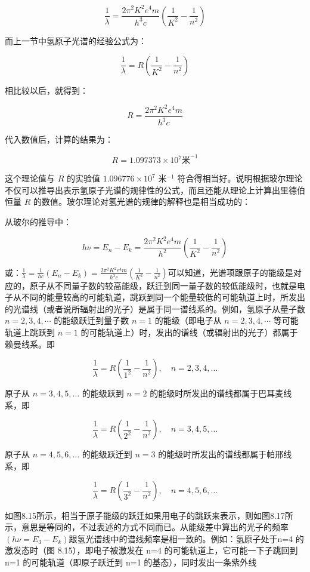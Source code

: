 \[
\frac {1}{\lambda} = \frac {2 \pi^ {2} K ^ {2} e ^ {4} m}{h ^ {3} c} \left(\frac {1}{K ^ {2}} - \frac {1}{n ^ {2}}\right)
\]

而上一节中氢原子光谱的经验公式为：

\[
\frac {1}{\lambda} = R \left(\frac {1}{K ^ {2}} - \frac {1}{n ^ {2}}\right)
\]

相比较以后，就得到：

\[
R = \frac {2 \pi^ {2} K ^ {2} e ^ {4} m}{h ^ {3} c}
\]

代入数值后，计算的结果为：

\[
R = 1.097373 \times 10 ^ {7} \text{米} ^ {- 1}
\]

这个理论值与 \(R\) 的实验值 \(1.096776 \times 10^{7}\) 米\(^{-1}\)
符合得相当好。说明根据玻尔理论不仅可以推导出表示氢原子光谱的规律性的公式，而且还能从理论上计算出里德伯恒量
\(R\) 的数值。玻尔理论对氢光谱的规律的解释也是相当成功的：

从玻尔的推导中：

\[
h \nu = E _ {n} - E _ {k} = \frac {2 \pi^ {2} K ^ {2} e ^ {4} m}{h ^ {2}} \left(\frac {1}{K ^ {2}} - \frac {1}{n ^ {2}}\right)
\]

或：\(\frac{1}{\lambda} = \frac{1}{hc}\left(E_n - E_k\right) = \frac{2\pi^2K^2e^4m}{h^3c}\left(\frac{1}{K^2} -\frac{1}{n^2}\right)\)可以知道，光谱项跟原子的能级是对应的，原子从不同量子数的较高能级，跃迁到同一量子数的较低能级时，也就是电子从不同的能量较高的可能轨道，跳跃到同一个能量较低的可能轨道上时，所发出的光谱线（或者说所辐射出的光子）是属于同一谱线系的。例如，氢原子从量子数
\(n=2,3,4,\cdots\) 的能级跃迁到量子数 \(n=1\) 的能级（即电子从
\(n=2,3,4,\cdots\) 等可能轨道上跳跃到 \(n=1\)
的可能轨道上）时，发出的谱线（或辐射出的光子）都属于赖曼线系。即

\[
\frac {1}{\lambda} = R \left(\frac {1}{1 ^ {2}} - \frac {1}{n ^ {2}}\right), \quad n = 2, 3, 4, \dots
\]

原子从 \(n = 3,4,5,\dots\) 的能级跃到 \(n = 2\)
的能级时所发出的谱线都属于巴耳麦线系，即

\[
\frac {1}{\lambda} = R \left(\frac {1}{2 ^ {2}} - \frac {1}{n ^ {2}}\right), \quad n = 3, 4, 5, \dots
\]

原子从 \(n = 4,5,6,\dots\) 的能级跃迁到 \(n = 3\)
的能级时所发出的谱线都属于帕邢线系，即

\[
\frac {1}{\lambda} = R \left(\frac {1}{3 ^ {2}} - \frac {1}{n ^ {2}}\right), \quad n = 4, 5, 6, \dots
\]

如图8.15所示，相当于原子能级的跃迁如果用电子的跳跃来表示，则如图8.17所示，意思是等同的，不过表述的方式不同而已。从能级差中算出的光子的频率
\((h\nu = E_3 - E_k)\)跟氢光谱线中的谱线频率是相一致的。例如：氢原子处于n=4
的激发态时（图 8.15），即电子被激发在 n=4
的可能轨道上，它可能一下子跳回到 n=1 的可能轨道（即原子跃迁到 n=1
的基态），同时发出一条紫外线

